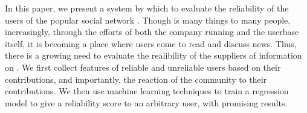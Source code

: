 In this paper, we present a system by which to evaluate the reliability of the
users of the popular social network \reddit. Though \reddit is many things to many
people, increasingly, through the efforts of both the company running \reddit and
the userbase itself, it is becoming a place where users come to read and discuss
news. Thus, there is a growing need to evaluate the realibility of the suppliers
of information on \reddit. We first collect features of reliable and unreliable
users based on their contributions, and importantly, the reaction of the
community to their contributions. We then use machine learning techniques to
train a regression model to give a reliability score to an arbitrary user, with
promising results.
